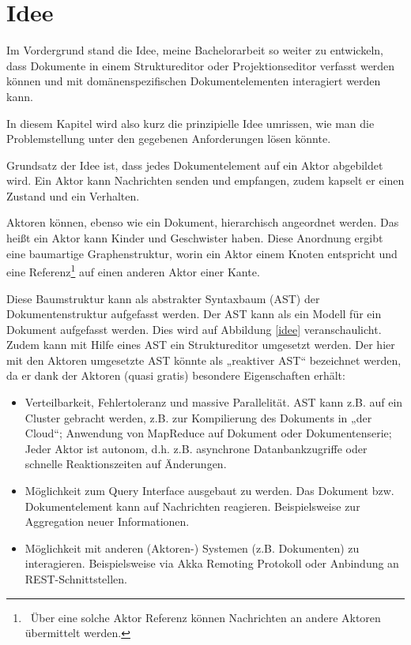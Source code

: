  
\section{Idee}\label{}
 
Im Vordergrund stand die Idee, meine Bachelorarbeit \citep{Hodapp} so weiter zu entwickeln, dass Dokumente in einem Struktureditor oder Projektionseditor verfasst werden können und mit domänenspezifischen Dokumentelementen interagiert werden kann.

 
In diesem Kapitel wird also kurz die prinzipielle Idee umrissen, wie man die Problemstellung unter den gegebenen Anforderungen lösen könnte.

 
Grundsatz der Idee ist, dass jedes Dokumentelement auf ein Aktor abgebildet wird. Ein Aktor kann Nachrichten senden und empfangen, zudem kapselt er einen Zustand und ein Verhalten.

 
Aktoren können, ebenso wie ein Dokument, hierarchisch angeordnet werden. Das heißt ein Aktor kann Kinder und Geschwister haben. Diese Anordnung ergibt eine baumartige Graphenstruktur, worin ein Aktor einem Knoten entspricht und eine Referenz\footnote{~Über eine solche Aktor Referenz können Nachrichten an andere Aktoren übermittelt werden.} auf einen anderen Aktor einer Kante.

 
Diese Baumstruktur kann als abstrakter Syntaxbaum (AST) der Dokumentenstruktur aufgefasst werden. Der AST kann als ein Modell für ein Dokument aufgefasst werden. Dies wird auf Abbildung \ref{idee} veranschaulicht. Zudem kann mit Hilfe eines AST ein Struktureditor umgesetzt werden. Der hier mit den Aktoren umgesetzte AST könnte als „reaktiver AST“ bezeichnet werden, da er dank der Aktoren (quasi gratis) besondere Eigenschaften erhält:

 
\begin{itemize}

\item Verteilbarkeit, Fehlertoleranz und massive Parallelität. AST kann z.B. auf ein Cluster gebracht werden, z.B. zur Kompilierung des Dokuments in „der Cloud“; Anwendung von MapReduce auf Dokument oder Dokumentenserie; Jeder Aktor ist autonom, d.h. z.B. asynchrone Datanbankzugriffe oder schnelle Reaktionszeiten auf Änderungen.
\item Möglichkeit zum Query Interface ausgebaut zu werden. Das Dokument bzw. Dokumentelement kann auf Nachrichten reagieren. Beispielsweise zur Aggregation neuer Informationen.
\item Möglichkeit mit anderen (Aktoren-) Systemen (z.B. Dokumenten) zu interagieren. Beispielsweise via Akka Remoting Protokoll oder Anbindung an REST-Schnittstellen.
\end{itemize}
 
